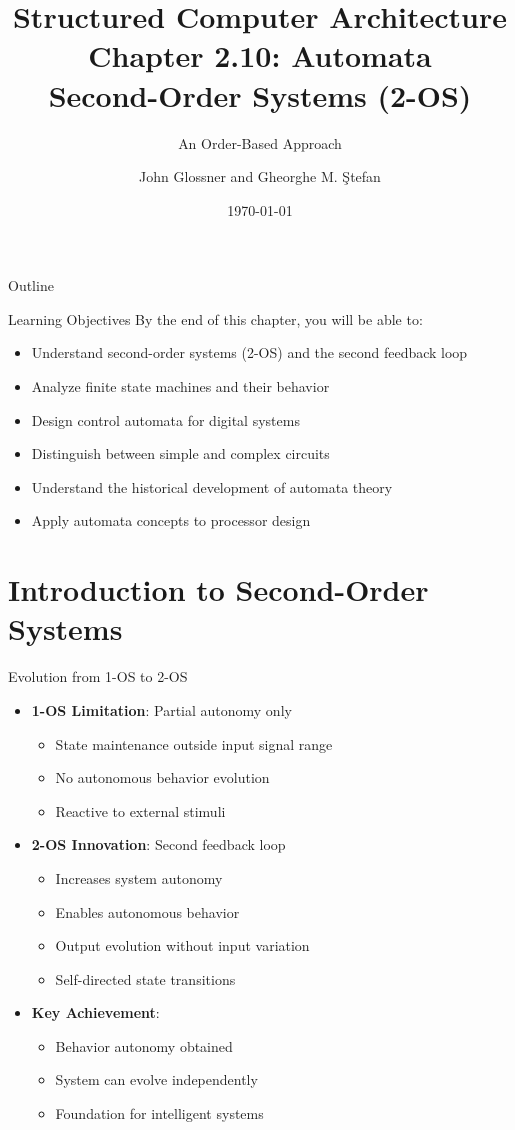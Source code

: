 \documentclass[aspectratio=169,11pt]{beamer}
\title[Chapter 2.10: Automata]{Structured Computer Architecture\\Chapter 2.10: Automata\\Second-Order Systems (2-OS)}
\subtitle{An Order-Based Approach}
\author{John Glossner and Gheorghe M. Ştefan}
\institute{Based on the textbook}
\date{\today}
\newcommand{\concept}[1]{\textbf{\color{accentcolor}#1}}
\begin{document}
\begin{frame}
\titlepage
\end{frame}

\begin{frame}{Outline}
\tableofcontents
\end{frame}

\begin{frame}{Learning Objectives}
By the end of this chapter, you will be able to:
\begin{itemize}
\item Understand second-order systems (2-OS) and the second feedback loop
\item Analyze finite state machines and their behavior
\item Design control automata for digital systems
\item Distinguish between simple and complex circuits
\item Understand the historical development of automata theory
\item Apply automata concepts to processor design
\end{itemize}
\end{frame}

\section{Introduction to Second-Order Systems}

\begin{frame}{Evolution from 1-OS to 2-OS}
\begin{itemize}
\item \concept{1-OS Limitation}: Partial autonomy only
\begin{itemize}
\item State maintenance outside input signal range
\item No autonomous behavior evolution
\item Reactive to external stimuli
\end{itemize}
\vspace{0.5cm}
\item \concept{2-OS Innovation}: Second feedback loop
\begin{itemize}
\item Increases system autonomy
\item Enables autonomous behavior
\item Output evolution without input variation
\item Self-directed state transitions
\end{itemize}
\vspace{0.3cm}
\item \concept{Key Achievement}: 
\begin{itemize}
\item Behavior autonomy obtained
\item System can evolve independently
\item Foundation for intelligent systems
\end{itemize}
\end{itemize}
\end{frame}
\end{document}
